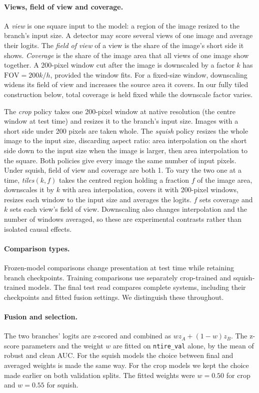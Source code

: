\documentclass[letterpaper]{article} %
\newcommand{\fov}{\mathrm{FOV}}
\begin{document}
\paragraph{Views, field of view and coverage.} A \emph{view} is one
square input to the model: a region of the image resized to the branch's input
size. A detector may score several views of one image and average their
logits. The \emph{field of view} of a view is the share of the image's short
side it shows. \emph{Coverage} is the share of the image area that all views
of one image show together. A 200-pixel window cut after the image is
downscaled by a factor $k$ has $\fov = 200k/h$, provided the window fits.
For a fixed-size window, downscaling widens its field of view and increases
the source area it covers. In our fully tiled construction below, total
coverage is held fixed while the downscale factor varies.

The \emph{crop} policy takes one 200-pixel window at native resolution (the
centre window at test time) and resizes it to the branch's input size. Images
with a short side under 200 pixels are taken whole. The \emph{squish} policy
resizes the whole image to the input size, discarding aspect ratio: area
interpolation on the short side down to the input size when the image is
larger, then area interpolation to the square. Both policies give every image
the same number of input pixels. Under squish, field of view and coverage are
both 1. To vary the two one at a time, \emph{tiles}$(k, f)$ takes the centred
region holding a fraction $f$ of the image area, downscales it by $k$ with
area interpolation, covers it with 200-pixel windows, resizes each window to
the input size and averages the logits. $f$ sets coverage and $k$ sets each
view's field of view. Downscaling also changes interpolation and the
number of windows averaged, so these are experimental contrasts rather
than isolated causal effects.

\paragraph{Comparison types.} Frozen-model comparisons change presentation
at test time while retaining branch checkpoints. Training comparisons use
separately crop-trained and squish-trained models. The final test read
compares complete systems, including their checkpoints and fitted fusion
settings. We distinguish these throughout.

\paragraph{Fusion and selection.} The two branches' logits are z-scored and
combined as $w z_A + (1-w) z_B$. The z-score parameters and the weight $w$ are
fitted on \texttt{ntire\_val} alone, by the mean of robust and clean AUC. For
the squish models the choice between final and averaged weights is made the
same way. For the crop models we kept the choice made earlier on both
validation splits. The fitted weights were $w = 0.50$ for crop and $w = 0.55$
for squish.
\end{document}

